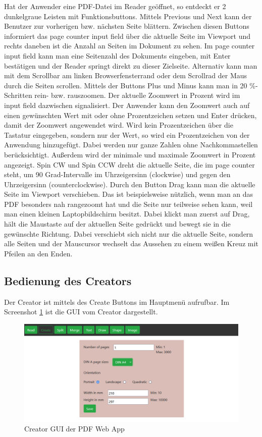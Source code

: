 Hat der Anwender eine PDF-Datei im Reader geöffnet, so entdeckt er 2 dunkelgraue Leisten mit Funktionsbuttons. Mittels Previous und Next kann der Benutzer zur vorherigen bzw. nächsten Seite blättern. Zwischen diesen Buttons informiert das page counter input field über die aktuelle Seite im Viewport und rechts daneben ist die Anzahl an Seiten im Dokument zu sehen. Im page counter input field kann man eine Seitenzahl des Dokuments eingeben, mit Enter bestätigen und der Reader springt direkt zu dieser Zielseite. Alternativ kann man mit dem Scrollbar am linken Browserfensterrand oder dem Scrollrad der Maus durch die Seiten scrollen. Mittels der Buttons Plus und Minus kann man in 20 \%-Schritten rein- bzw. rauszoomen. Der aktuelle Zoomwert in Prozent wird im input field dazwischen signalisiert. Der Anwender kann den Zoomwert auch auf einen gewünschten Wert mit oder ohne Prozentzeichen setzen und Enter drücken, damit der Zoomwert angewendet wird. Wird kein Prozentzeichen über die Tastatur eingegeben, sondern nur der Wert, so wird ein Prozentzeichen von der Anwendung hinzugefügt. Dabei werden nur ganze Zahlen ohne Nachkommastellen berücksichtigt. Außerdem wird der minimale und maximale Zoomwert in Prozent angezeigt. Spin CW und Spin CCW dreht die aktuelle Seite, die im page counter steht, um 90 Grad-Intervalle im Uhrzeigersinn (clockwise) und gegen den Uhrzeigersinn (counterclockwise). Durch den Button Drag kann man die aktuelle Seite im Viewport verschieben. Das ist beispielsweise nützlich, wenn man an das PDF besonders nah rangezoomt hat und die Seite nur teilweise sehen kann, weil man einen kleinen Laptopbildschirm besitzt. Dabei klickt man zuerst auf Drag, hält die Maustaste auf der aktuellen Seite gedrückt und bewegt sie in die gewünschte Richtung. Dabei verschiebt sich nicht nur die aktuelle Seite, sondern alle Seiten und der Mauscursor wechselt das Aussehen zu einem weißen Kreuz mit Pfeilen an den Enden.

\subsection{Bedienung des Creators}
Der Creator ist mittels des Create Buttons im Hauptmenü aufrufbar. Im Screenshot \ref{fig:creator} ist die GUI vom Creator dargestellt. 

\begin{figure}[!htbp]
	\centering
	\includegraphics[width=1\textwidth]{"images/creator.png"}
	\caption{Creator GUI der PDF Web App}
	\label{fig:creator}
\end{figure}

